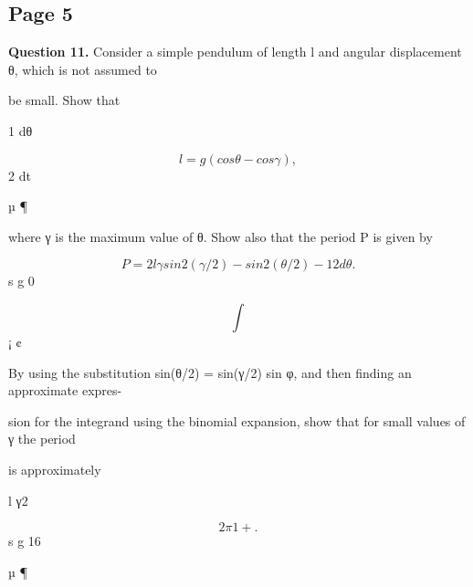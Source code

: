 \documentclass[12pt]{article}
\begin{document}
\subsection*{Page 5}
\begin{flushleft}
\bigskip\textbf{Question 11.} Consider a simple pendulum of length l and angular displacement θ, which is not assumed to\par
be small. Show that\par
1 dθ\par
\[l = g(cos θ - cos γ) ,\]
2 dt\par
µ ¶\par
where γ is the maximum value of θ. Show also that the period P is given by\par
\[P = 2 l γ sin 2 (γ/2) - sin 2 (θ/2) - 1 2 dθ .\]
s g 0\par
\[\int\]
¡ ¢\par
By using the substitution sin(θ/2) = sin(γ/2) sin φ, and then finding an approximate expres-\par
sion for the integrand using the binomial expansion, show that for small values of γ the period\par
is approximately\par
l γ2\par
\[2\pi 1 + .\]
s g 16\par
µ ¶\par
\end{flushleft}
\end{document}
